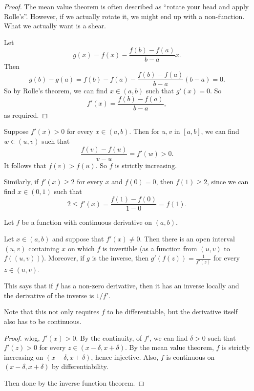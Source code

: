 \documentclass[a4paper]{article}
\begin{document}
\begin{proof}
  The mean value theorem is often described as ``rotate your head and apply Rolle's''. However, if we actually rotate it, we might end up with a non-function. What we actually want is a shear.

  Let
  \[
    g(x) = f(x) - \frac{f(b) - f(a)}{b - a}x.
  \]
  Then
  \[
    g(b) - g(a) = f(b) - f(a) - \frac{f(b) - f(a)}{b - a}(b - a) = 0.
  \]
  So by Rolle's theorem, we can find $x\in (a, b)$ such that $g'(x) = 0$. So
  \[
    f'(x) = \frac{f(b) - f(a)}{b - a},
  \]
  as required.
\end{proof}

\begin{eg}
  Suppose $f'(x) > 0$ for every $x\in (a, b)$. Then for $u, v$ in $[a, b]$, we can find $w\in (u, v)$ such that
  \[
    \frac{f(v) - f(u)}{v - u} = f'(w) > 0.
  \]
  It follows that $f(v) > f(u)$. So $f$ is strictly increasing.

  Similarly, if $f'(x) \geq 2$ for every $x$ and $f(0) = 0$, then $f(1) \geq 2$, since we can find $x\in (0, 1)$ such that
  \[
    2\leq f'(x) = \frac{f(1) - f(0)}{1 - 0} = f(1).
  \]
\end{eg}

\begin{thm}
  Let $f$ be a function with continuous derivative on $(a, b)$.

  Let $x\in (a, b)$ and suppose that $f'(x) \not= 0$. Then there is an open interval $(u, v)$ containing $x$ on which $f$ is invertible (as a function from $(u, v)$ to $f((u, v))$). Moreover, if $g$ is the inverse, then $g'(f(z)) = \frac{1}{f'(z)}$ for every $z\in (u, v)$.

  This says that if $f$ has a non-zero derivative, then it has an inverse locally and the derivative of the inverse is $1/f'$.
\end{thm}
Note that this not only requires $f$ to be differentiable, but the derivative itself also has to be continuous.

\begin{proof}
  wlog, $f'(x) > 0$. By the continuity, of $f'$, we can find $\delta > 0$ such that $f'(z) > 0$ for every $z\in (x - \delta, x + \delta)$. By the mean value theorem, $f$ is strictly increasing on $(x - \delta, x + \delta)$, hence injective. Also, $f$ is continuous on $(x - \delta, x + \delta)$ by differentiability.

  Then done by the inverse function theorem.
\end{proof}
\end{document}
